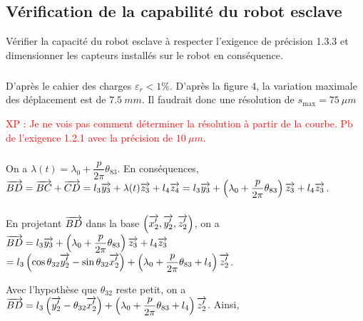 \documentclass[10pt,fleqn]{article} %
\begin{document}
\subsection{Vérification de la capabilité du robot esclave}
\begin{obj}
Vérifier la capacité du robot esclave à respecter l’exigence de précision 1.3.3 et dimensionner les
capteurs installés sur le robot en conséquence.
\end{obj}


\subparagraph{}%

D'après le cahier des charges $\varepsilon_r<1\%$. 
D'après la figure 4, la variation maximale des déplacement est de $\SI{7,5}{mm}$. Il faudrait donc une résolution de $s_{\text{max}}=\SI{75}{\mu m}$


\textcolor{red}{XP : Je ne vois pas comment déterminer la résolution à partir de la courbe. Pb de l'exigence 1.2.1 avec la précision de $\SI{10}{\mu m}$.}

\subparagraph{}%
On a $\lambda(t)=\lambda_0 + \dfrac{p}{2\pi} \theta_{83}$. 
En conséquences, $\overrightarrow{BD}=\overrightarrow{BC}+\overrightarrow{CD}=l_3\overrightarrow{y_3}+\lambda(t)\overrightarrow{z_3}+l_4\overrightarrow{z_4}
=l_3\overrightarrow{y_3}+\left( \lambda_0 + \dfrac{p}{2\pi} \theta_{83} \right)\overrightarrow{z_3}+l_4\overrightarrow{z_3}$.


\subparagraph{}%



En projetant $\overrightarrow{BD}$ dans la base $\left(\overrightarrow{x_2'},\overrightarrow{y_2'},\overrightarrow{z_2'} \right)$, on a 
 $\overrightarrow{BD}=l_3\overrightarrow{y_3}+\left( \lambda_0 + \dfrac{p}{2\pi} \theta_{83} \right)\overrightarrow{z_3}+l_4\overrightarrow{z_3}$
 $ =l_3\left( \cos \theta_{32} \overrightarrow{y_2'} - \sin\theta_{32} \overrightarrow{x_2'}  \right)+\left( \lambda_0 + \dfrac{p}{2\pi} \theta_{83} +l_4\right)\overrightarrow{z_2'}$.
 
 Avec l'hypothèse que $\theta_{32}$ reste petit, on a  $\overrightarrow{BD}=l_3\left(  \overrightarrow{y_2'} - \theta_{32} \overrightarrow{x_2'}  \right)+\left( \lambda_0 + \dfrac{p}{2\pi} \theta_{83} +l_4\right)\overrightarrow{z_2'}$.
  Ainsi,
  
\end{document}
